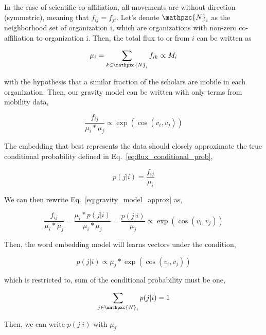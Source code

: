 \documentclass[12pt]{article} %
\begin{document}
In the case of scientific co-affiliation, all movements are without direction (symmetric), meaning that  $f_{ij} = f_{ji}$.
Let's denote $\mathpzc{N}_i$ as the neighborhood set of organization i, which are organizations with non-zero co-affiliation to organization i.
Then, the total flux to or from $i$ can be written as 

\begin{equation}
    \mu_{i} = \sum_{k\in\mathpzc{N}_i} f_{ik} \propto M_i
\end{equation} 

with the hypothesis that a similar fraction of the scholars are mobile in each organization. Then, our gravity model can be written with only terms from mobility data, 

\begin{equation}
    \label{eq:gravity_model_approx}
    \frac{f_{ij}}{\mu_i * \mu_j} \propto \exp(\cos(v_i,v_j))
\end{equation}

The embedding that best represents the data should closely approximate the true conditional probability defined in
Eq.~\ref{eq:flux_conditional_prob},

\begin{equation}
    \label{eq:flux_conditional_prob}
    p(j|i) = \frac{f_{ij}}{\mu_i} 
\end{equation}

We can then rewrite Eq.~\ref{eq:gravity_model_approx} as, 

\begin{equation}
    \label{eq:gravity_relationship}
    \frac{f_{ij}}{\mu_i * \mu_j} = \frac{\mu_i * p(j|i)}{\mu_i * \mu_j} =  \frac{p(j|i)}{\mu_j} \propto \exp(\cos(v_i,v_j))
\end{equation}

Then, the word embedding model will learns vectors under the condition,

\begin{equation}
    \label{eq:conditional probability}
      p(j|i) \propto {\mu_j}* \exp(\cos(v_i,v_j))
\end{equation}

which is restricted to, sum of the conditional probability must be one,

\begin{equation}
    \label{eq:sum of the conditional probabiitliy}
    \sum_{j\in\mathpzc{N}_i} p(j|i) = 1
\end{equation}

Then, we can write $p(j|i)$ with $\mu_{j}$
\end{document}
